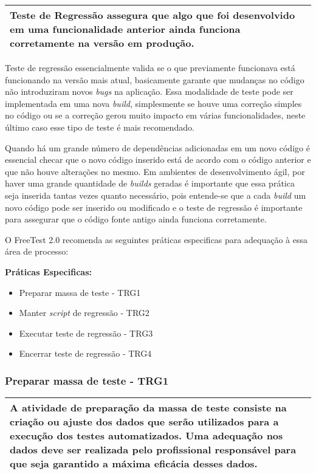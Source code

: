 \begin{table}[H]
\centering
\begin{tabular}{|p{130mm}|}
\hline
 Teste de Regressão assegura que algo que foi desenvolvido em uma funcionalidade anterior ainda funciona corretamente na versão em produção. \\
\hline
\end{tabular}
\end{table}

Teste de regressão essencialmente valida se o que previamente funcionava está funcionando na versão mais atual, basicamente garante que mudanças no código não introduziram novos \textit{bugs} na aplicação. Essa modalidade de teste pode ser implementada em uma nova \textit{build}, simplesmente se houve uma correção simples no código ou se a correção gerou muito impacto em várias funcionalidades, neste último caso esse tipo de teste é mais recomendado.

Quando há um grande número de dependências adicionadas em um novo código é essencial checar que o novo código inserido está de acordo com o código anterior e que não houve alterações no mesmo. Em ambientes de desenvolvimento ágil, por haver uma grande quantidade de \textit{builds} geradas é importante que essa prática seja inserida tantas vezes quanto necessário, pois entende-se que a cada \textit{build} um novo código pode ser inserido ou modificado e o teste de regressão é importante para assegurar que o código fonte antigo ainda funciona corretamente.

O FreeTest 2.0 recomenda as seguintes práticas especificas para adequação à essa área de processo:

\textbf{Práticas Especificas:}

\begin{itemize}    
    \item Preparar massa de teste - TRG1
    \item Manter \textit{script} de regressão - TRG2
    \item Executar teste de regressão - TRG3
    \item Encerrar teste de regressão - TRG4
\end{itemize}

\subsubsection{Preparar massa de teste - TRG1}
\label{sec:trg1}

\begin{table}[H]
\centering
\begin{tabular}{|p{130mm}|}
\hline
A atividade de preparação da massa de teste consiste na criação ou ajuste dos dados que serão utilizados para a execução dos testes automatizados. Uma adequação nos dados deve ser realizada pelo profissional responsável para que seja garantido a máxima eficácia desses dados. \\ 
\hline
\end{tabular}
\end{table}

